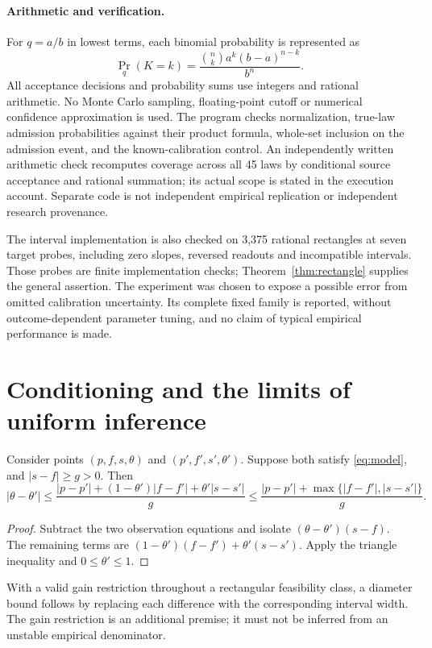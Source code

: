 \documentclass[11pt,a4paper]{article}
\theoremstyle{definition}\newtheorem{definition}[theorem]{Definition}
\begin{document}
\paragraph{Arithmetic and verification.}
For $q=a/b$ in lowest terms, each binomial probability is represented as
\[
\Pr_q(K=k)=\frac{\binom nk a^k(b-a)^{n-k}}{b^n}.
\]
All acceptance decisions and probability sums use integers and rational arithmetic. No Monte Carlo sampling, floating-point cutoff or numerical confidence approximation is used. The program checks normalization, true-law admission probabilities against their product formula, whole-set inclusion on the admission event, and the known-calibration control. An independently written arithmetic check recomputes coverage across all 45 laws by conditional source acceptance and rational summation; its actual scope is stated in the execution account. Separate code is not independent empirical replication or independent research provenance.

The interval implementation is also checked on 3,375 rational rectangles at seven target probes, including zero slopes, reversed readouts and incompatible intervals. Those probes are finite implementation checks; Theorem~\ref{thm:rectangle} supplies the general assertion. The experiment was chosen to expose a possible error from omitted calibration uncertainty. Its complete fixed family is reported, without outcome-dependent parameter tuning, and no claim of typical empirical performance is made.

\section{Conditioning and the limits of uniform inference}

\begin{proposition}\label{prop:gain}
Consider points $(p,f,s,\theta)$ and $(p',f',s',\theta')$. Suppose both satisfy \eqref{eq:model}, and $|s-f|\ge g>0$. Then
\[
|\theta-\theta'|\le
\frac{|p-p'|+(1-\theta')|f-f'|+\theta'|s-s'|}{g}
\le\frac{|p-p'|+\max\{|f-f'|,|s-s'|\}}{g}.
\]
\end{proposition}
\begin{proof}
Subtract the two observation equations and isolate $(\theta-\theta')(s-f)$. The remaining terms are $(1-\theta')(f-f')+\theta'(s-s')$. Apply the triangle inequality and $0\le\theta'\le1$.
\end{proof}

With a valid gain restriction throughout a rectangular feasibility class, a diameter bound follows by replacing each difference with the corresponding interval width. The gain restriction is an additional premise; it must not be inferred from an unstable empirical denominator.
\end{document}
